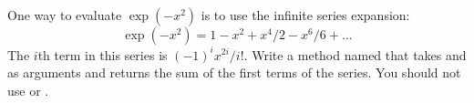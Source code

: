 \begin{exercise}  %

One way to evaluate $\exp(-x^2)$ is to use the infinite series expansion:
%
\[ \exp(-x^2) = 1 - x^2 + x^4/2 - x^6/6 + \ldots \]
%
The $i$th term in this series is $(-1)^i x^{2i} / i!$.
Write a method named  that takes  and  as arguments and returns the sum of the first  terms of the series.
You should not use  or .

\end{exercise}

